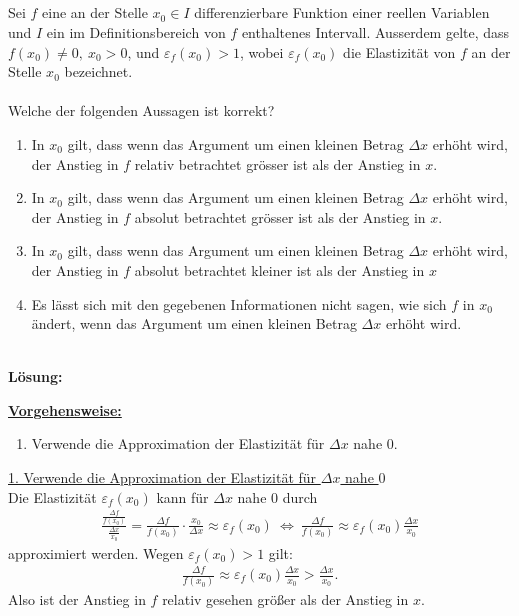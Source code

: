 \subsection*{}
Sei $f$ eine an der Stelle $x_0 \in I$ differenzierbare Funktion einer reellen Variablen und $I$ ein im Definitionsbereich von $f$ enthaltenes Intervall.
Ausserdem gelte, dass $f(x_0)  \neq 0, \ x_0 > 0$, und $\varepsilon_f(x_0) > 1$, wobei $\varepsilon_f(x_0)$ die Elastizität von $f$ an der Stelle $x_0$ bezeichnet.\\
\\
Welche der folgenden Aussagen ist korrekt?
\renewcommand{\labelenumi}{(\alph{enumi})}
\begin{enumerate}
	\item 
	In $x_0$ gilt, dass wenn das Argument um einen kleinen Betrag $\Delta x$ erhöht wird, der Anstieg in $f$ relativ betrachtet grösser ist als der Anstieg in $x$.
	\item
	In $x_0$ gilt, dass wenn das Argument um einen kleinen Betrag $\Delta x$ erhöht wird, der Anstieg in $f$ absolut betrachtet grösser ist als der Anstieg in $x$.
	\item
	In $x_0$ gilt, dass wenn das Argument um einen kleinen Betrag $\Delta x$ erhöht wird, der Anstieg in $f$ absolut betrachtet kleiner ist als der Anstieg in $x$
	\item
	Es lässt sich mit den gegebenen Informationen nicht sagen, wie sich $f$ in $x_0$ ändert, wenn das Argument um einen kleinen Betrag $\Delta x$ erhöht wird.
\end{enumerate}
\ \\
\textbf{Lösung:}
\begin{mdframed}
	\underline{\textbf{Vorgehensweise:}}
	\renewcommand{\labelenumi}{\theenumi.}
	\begin{enumerate}
		\item Verwende die Approximation der Elastizität für $\Delta x $ nahe $0$.
	\end{enumerate}
\end{mdframed}

\underline{1. Verwende die Approximation der Elastizität für $\Delta x $ nahe $0$}\\
Die Elastizität $\varepsilon_f(x_0)$ kann für $\Delta x$ nahe $0$ durch
\begin{align*}
	\frac{\frac{\Delta f}{f(x_0)}}{\frac{\Delta x}{x_0}}
	= 
	\frac{\Delta f}{f(x_0)} \cdot \frac{x_0}{\Delta x} \approx \varepsilon_f(x_0)
 	\ \Leftrightarrow \
 	\frac{\Delta f}{f(x_0)} \approx \varepsilon_f(x_0 )\frac{\Delta x}{x_0}
\end{align*} 
approximiert werden. Wegen $\varepsilon_f(x_0) > 1$ gilt:
\begin{align*}
	\frac{\Delta f}{f(x_0)} \approx \varepsilon_f(x_0 )\frac{\Delta x}{x_0}
	> 
	\frac{\Delta x}{x_0}.
\end{align*} 
Also ist der Anstieg in $f$ relativ gesehen größer als der Anstieg in $x$.

